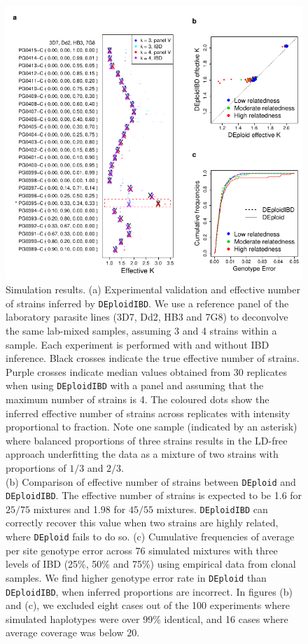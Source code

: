 \documentclass[9pt,lineno]{elife}
\begin{document}
\begin{figure}[htp]
  \begin{center}
  \includegraphics[width=\textwidth]{Fig2.pdf}
  \caption{Simulation results. (a) Experimental validation and effective number of strains inferred by {\tt DEploidIBD}. We use a reference panel of the laboratory parasite lines (3D7, Dd2, HB3 and 7G8) to deconvolve the same lab-mixed samples, assuming 3 and 4 strains within a sample. Each experiment is performed with and without IBD inference. Black crosses indicate the true effective number of strains. Purple crosses indicate median values obtained from 30 replicates when using {\tt DEploidIBD} with a panel and assuming that the maximum number of strains is 4. The coloured dots show the inferred effective number of strains across replicates with intensity proportional to fraction. Note one sample (indicated by an asterisk) where balanced proportions of three strains results in the LD-free approach underfitting the data as a mixture of two strains with proportions of $1/3$ and $2/3$.\\  (b) Comparison of effective number of strains between \texttt{DEploid} and \texttt{DEploidIBD}. The effective number of strains is expected to be 1.6 for $25/75$ mixtures and 1.98 for $45/55$ mixtures. \texttt{DEploidIBD} can correctly recover this value when two strains are highly related, where \texttt{DEploid} fails to do so. (c) Cumulative frequencies of average per site genotype error across 76 simulated mixtures with three levels of IBD (25\%, 50\% and 75\%) using empirical data from clonal samples. We find higher genotype error rate in \texttt{DEploid} than \texttt{DEploidIBD}, when inferred proportions are incorrect. In figures (b) and (c), we excluded eight cases out of the 100 experiments where simulated haplotypes were over 99\% identical, and 16 cases where average coverage was below 20.
}
\end{center}
\end{figure}
\end{document}
